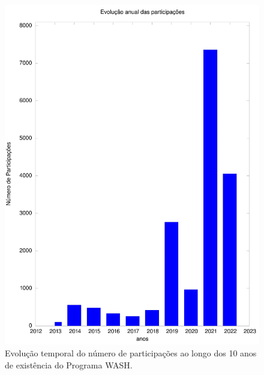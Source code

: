 \documentclass[
12pt,		%
openright,	%
twoside,  %
a4paper,			%
chapter=TITLE,		%
english,			%
french,				%
spanish,			%
brazil				%
]{USPSC-classe/USPSC}
\begin{document}
\begin{figure}[max size={\textwidth}{\textheight}]
\begin{minipage}[b]{0.4\linewidth}
        \centering
                \includegraphics[width=1.0\linewidth]{../../imagens/output-participantes.jpeg}
                \caption{Evolu\c{c}\~ao temporal do n\'umero de participa\c{c}\~oes ao longo dos 10 anos de exist\^encia do Programa WASH.}
                \label{19699bcc5ab8317274249d6743d62534dbfb95fa}
\end{minipage}%
\hspace{0.5cm}
\begin{minipage}[b]{0.4\linewidth}
        \centering

\end{minipage}
\end{figure}
\end{document}
